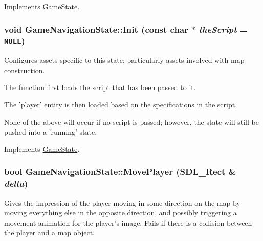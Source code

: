 Implements \hyperlink{class_game_state_de7bd9bda91253614322ca0ea77b7a14}{GameState}.\hypertarget{class_game_navigation_state_63c99936c2338e5cfeb71c8ffbd88b7f}{
\subsubsection[{Init}]{\setlength{\rightskip}{0pt plus 5cm}void GameNavigationState::Init (const char $\ast$ {\em theScript} = {\tt NULL})}}
\label{de/d2a/class_game_navigation_state_63c99936c2338e5cfeb71c8ffbd88b7f}


Configures assets specific to this state; particularly assets involved with map construction. 

The function first loads the script that has been passed to it.

The 'player' entity is then loaded based on the specifications in the script.

None of the above will occur if no script is passed; however, the state will still be pushed into a 'running' state.

Implements \hyperlink{class_game_state_488fd39ceb2907b13e11f03607f16e5f}{GameState}.\hypertarget{class_game_navigation_state_40ef4ee4596f6e727e2f6bd7e2a352bf}{
\subsubsection[{MovePlayer}]{\setlength{\rightskip}{0pt plus 5cm}bool GameNavigationState::MovePlayer (SDL\_\-Rect \& {\em delta})}}
\label{de/d2a/class_game_navigation_state_40ef4ee4596f6e727e2f6bd7e2a352bf}


Gives the impression of the player moving in some direction on the map by moving everything else in the opposite direction, and possibly triggering a movement animation for the player's image. Fails if there is a collision between the player and a map object.

